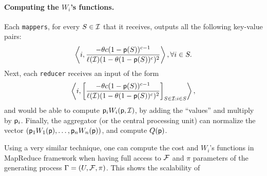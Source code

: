 \paragraph{\bf Computing  the $W_i$'s functions.}
Each \texttt{mappers}, for every $S\in \mathcal{I}$ that it receives, outputs all the following key-value pairs:
$$\left\langle i,  \frac{-\theta c (1-\mathsf{p}(S))^{c-1}}{\ell(\mathcal{I})(1-\theta(1-\mathsf{p}(S))^c)^2} \right\rangle, \forall i \in S.$$
Next, each \texttt{reducer} receives an input of the form
$$\left\langle i,  \left[\frac{-\theta c (1-\mathsf{p}(S))^{c-1}}{\ell(\mathcal{I})(1-\theta(1-\mathsf{p}(S))^c)^2}\right]_{S\in \mathcal{I}: i\in S} \right\rangle,$$
and would be able to compute $\mathsf{p}_iW_i(\mathsf{p}, \mathcal{I})$, by adding the ``values'' and multiply by $\mathsf{p}_i$.
Finally, the aggregator (or the central processing unit) can normalize the vector $(\mathsf{p}_1W_1(\mathsf{p}), \ldots, \mathsf{p}_nW_n(\mathsf{p}))$, and compute $Q(\mathsf{p})$.

Using a very similar technique, one can compute the cost and $W_i$'s functions
in MapReduce framework when having full access to $\mathcal{F}$ and $\pi$ parameters
of the generating process $\Gamma=(U,\mathcal{F},\pi)$. This shows the scalability of
\algoname


